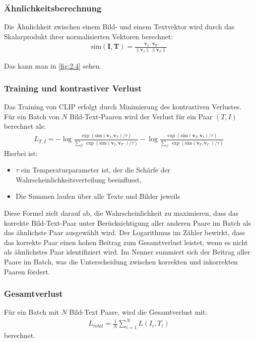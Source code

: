 \documentclass[nolibertine, ngerman, algorithm, nomencl, minted]{ttlab-qualify}
\begin{document}
\subsubsection{Ähnlichkeitsberechnung}
Die Ähnlichkeit zwischen einem Bild- und einem Textvektor wird durch das Skalarprodukt ihrer normalisierten Vektoren berechnet:
\begin{align*}
\text{sim}(\textbf{I}, \textbf{T}) = \frac{\textbf{v}_I \cdot \textbf{v}_T}{\| \textbf{v}_I \| \, \| \textbf{v}_T \|}
\end{align*}

Das kann man in \ref{fig:2.4} sehen.
\subsubsection{Training und kontrastiver Verlust}
Das Training von CLIP erfolgt durch Minimierung des kontrastiven Verlustes. Für ein Batch von \( N \) Bild-Text-Paaren wird der Verlust für ein Paar \( (T, I) \) berechnet als:
\begin{align*}
L_{T,I} = -\log \frac{\exp(\text{sim}(\textbf{v}_{I}, \textbf{v}_{T}) / \tau)}{\sum_{T´} \exp(\text{sim}(\textbf{v}_{I}, \textbf{v}_{T´}) / \tau)} - \log \frac{\exp(\text{sim}(\textbf{v}_{T}, \textbf{v}_{I}) / \tau)}{\sum_{I´} \exp(\text{sim}(\textbf{v}_{T}, \textbf{v}_{I´}) / \tau)} 
\end{align*}
Hierbei ist:
\begin{itemize}
 \item \( \tau \) ein Temperaturparameter ist, der die Schärfe der Wahrscheinlichkeitsverteilung beeinflusst,
 \item Die Summen laufen über alle Texte und Bilder jeweils
\end{itemize}

Diese Formel zielt darauf ab, die Wahrscheinlichkeit zu maximieren, dass das korrekte Bild-Text-Paar unter 
Berücksichtigung aller anderen Paare im Batch als das ähnlichste Paar ausgewählt wird. Der Logarithmus im 
Zähler bewirkt, dass das korrekte Paar einen hohen Beitrag zum Gesamtverlust leistet, wenn es nicht als ähnlichstes 
Paar identifiziert wird. Im Nenner summiert sich der Beitrag aller Paare im Batch, was die Unterscheidung zwischen 
korrekten und inkorrekten Paaren fördert.

\subsubsection{Gesamtverlust}
Für ein Batch mit $N$ Bild-Text Paare, wird die Gesamtverlust mit:
\begin{align*}
	L_{total} = \frac{1}{N} \sum_{i=1}^{N} L(I_i, T_i)
\end{align*}
berechnet.
\end{document}
